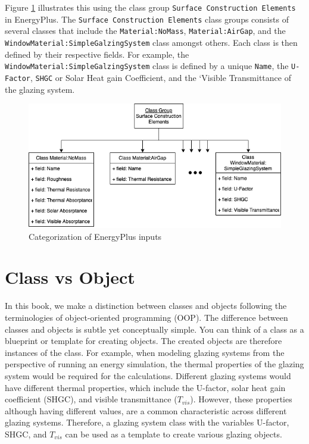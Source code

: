 \documentclass[
]{book}
\begin{document}
Figure \ref{fig:input-structure} illustrates this using the class group \texttt{Surface\ Construction\ Elements} in EnergyPlus. The \texttt{Surface\ Construction\ Elements} class groups consists of several classes that include the \texttt{Material:NoMass}, \texttt{Material:AirGap}, and the \texttt{WindowMaterial:SimpleGalzingSystem} class amongst others. Each class is then defined by their respective fields. For example, the \texttt{WindowMaterial:SimpleGalzingSystem} class is defined by a unique \texttt{Name}, the \texttt{U-Factor}, \texttt{SHGC} or Solar Heat gain Coefficient, and the `Visible Transmittance of the glazing system.

\begin{figure}

{\centering \includegraphics[width=0.8\linewidth]{figures/input_structure} 

}

\caption{Categorization of EnergyPlus inputs}\label{fig:input-structure}
\end{figure}

\hypertarget{class-vs-object}{%
\section{Class vs Object}\label{class-vs-object}}

In this book, we make a distinction between classes and objects following the terminologies of object-oriented programming (OOP). The difference between classes and objects is subtle yet conceptually simple. You can think of a class as a blueprint or template for creating objects. The created objects are therefore instances of the class. For example, when modeling glazing systems from the perspective of running an energy simulation, the thermal properties of the glazing system would be required for the calculations. Different glazing systems would have different thermal properties, which include the U-factor, solar heat gain coefficient (SHGC), and visible transmittance (\(T_{vis}\)). However, these properties although having different values, are a common characteristic across different glazing systems. Therefore, a glazing system class with the variables U-factor, SHGC, and \(T_{vis}\) can be used as a template to create various glazing objects.
\end{document}
